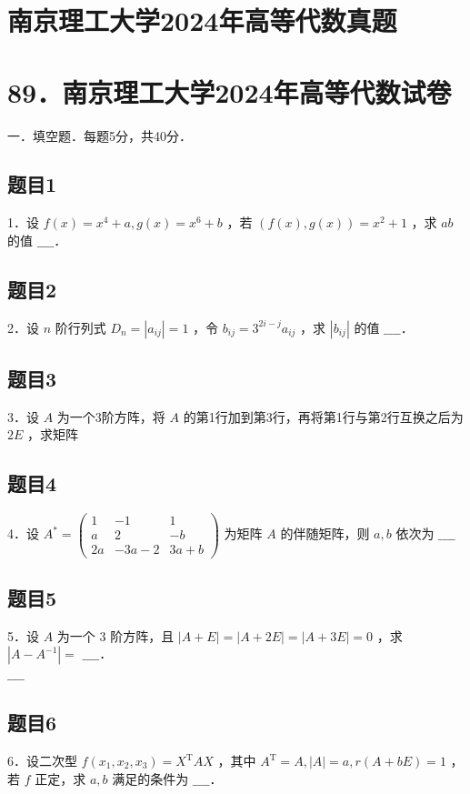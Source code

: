 \documentclass{article}
\begin{document}
\section*{南京理工大学2024年高等代数真题}
\section*{89．南京理工大学2024年高等代数试卷}
一．填空题．每题5分，共40分．\\

\subsection{题目1}
1．设 \(f(x)=x^{4}+a, g(x)=x^{6}+b\) ，若 \((f(x), g(x))=x^{2}+1\) ，求 \(a b\) 的值 \(\_\_\_\_\)．

\subsection{题目2}
2．设 \(n\) 阶行列式 \(D_{n}=\left|a_{i j}\right|=1\) ，令 \(b_{i j}=3^{2 i-j} a_{i j}\) ，求 \(\left|b_{i j}\right|\) 的值 \(\_\_\_\_\)．

\subsection{题目3}
3．设 \(A\) 为一个3阶方阵，将 \(A\) 的第1行加到第3行，再将第1行与第2行互换之后为 \(2 E\) ，求矩阵

\subsection{题目4}
4．设 \(A^{*}=\left(\begin{array}{ccc}1 & -1 & 1 \\ a & 2 & -b \\ 2 a & -3 a-2 & 3 a+b\end{array}\right)\) 为矩阵 \(A\) 的伴随矩阵，则 \(a, b\) 依次为 \(\_\_\_\_\)

\subsection{题目5}
5．设 \(A\) 为一个 3 阶方阵，且 \(|A+E|=|A+2 E|=|A+3 E|=0\) ，求 \(\left|A-A^{-1}\right|=\) \(\_\_\_\_\)．\\
\(\_\_\_\_\)

\subsection{题目6}
6．设二次型 \(f\left(x_{1}, x_{2}, x_{3}\right)=X^{\mathrm{T}} A X\) ，其中 \(A^{\mathrm{T}}=A,|A|=a, r(A+b E)=1\) ，若 \(f\) 正定，求 \(a, b\) 满足的条件为 \(\_\_\_\_\)．
\end{document}
